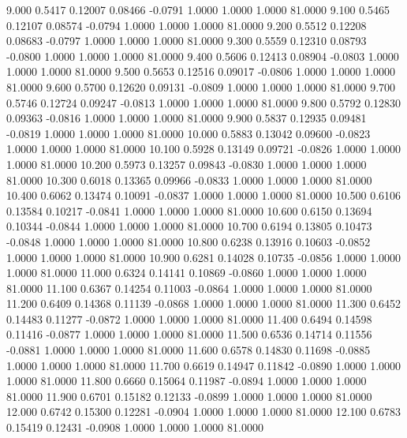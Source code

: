    9.000   0.5417   0.12007   0.08466  -0.0791   1.0000   1.0000   1.0000  81.0000
   9.100   0.5465   0.12107   0.08574  -0.0794   1.0000   1.0000   1.0000  81.0000
   9.200   0.5512   0.12208   0.08683  -0.0797   1.0000   1.0000   1.0000  81.0000
   9.300   0.5559   0.12310   0.08793  -0.0800   1.0000   1.0000   1.0000  81.0000
   9.400   0.5606   0.12413   0.08904  -0.0803   1.0000   1.0000   1.0000  81.0000
   9.500   0.5653   0.12516   0.09017  -0.0806   1.0000   1.0000   1.0000  81.0000
   9.600   0.5700   0.12620   0.09131  -0.0809   1.0000   1.0000   1.0000  81.0000
   9.700   0.5746   0.12724   0.09247  -0.0813   1.0000   1.0000   1.0000  81.0000
   9.800   0.5792   0.12830   0.09363  -0.0816   1.0000   1.0000   1.0000  81.0000
   9.900   0.5837   0.12935   0.09481  -0.0819   1.0000   1.0000   1.0000  81.0000
  10.000   0.5883   0.13042   0.09600  -0.0823   1.0000   1.0000   1.0000  81.0000
  10.100   0.5928   0.13149   0.09721  -0.0826   1.0000   1.0000   1.0000  81.0000
  10.200   0.5973   0.13257   0.09843  -0.0830   1.0000   1.0000   1.0000  81.0000
  10.300   0.6018   0.13365   0.09966  -0.0833   1.0000   1.0000   1.0000  81.0000
  10.400   0.6062   0.13474   0.10091  -0.0837   1.0000   1.0000   1.0000  81.0000
  10.500   0.6106   0.13584   0.10217  -0.0841   1.0000   1.0000   1.0000  81.0000
  10.600   0.6150   0.13694   0.10344  -0.0844   1.0000   1.0000   1.0000  81.0000
  10.700   0.6194   0.13805   0.10473  -0.0848   1.0000   1.0000   1.0000  81.0000
  10.800   0.6238   0.13916   0.10603  -0.0852   1.0000   1.0000   1.0000  81.0000
  10.900   0.6281   0.14028   0.10735  -0.0856   1.0000   1.0000   1.0000  81.0000
  11.000   0.6324   0.14141   0.10869  -0.0860   1.0000   1.0000   1.0000  81.0000
  11.100   0.6367   0.14254   0.11003  -0.0864   1.0000   1.0000   1.0000  81.0000
  11.200   0.6409   0.14368   0.11139  -0.0868   1.0000   1.0000   1.0000  81.0000
  11.300   0.6452   0.14483   0.11277  -0.0872   1.0000   1.0000   1.0000  81.0000
  11.400   0.6494   0.14598   0.11416  -0.0877   1.0000   1.0000   1.0000  81.0000
  11.500   0.6536   0.14714   0.11556  -0.0881   1.0000   1.0000   1.0000  81.0000
  11.600   0.6578   0.14830   0.11698  -0.0885   1.0000   1.0000   1.0000  81.0000
  11.700   0.6619   0.14947   0.11842  -0.0890   1.0000   1.0000   1.0000  81.0000
  11.800   0.6660   0.15064   0.11987  -0.0894   1.0000   1.0000   1.0000  81.0000
  11.900   0.6701   0.15182   0.12133  -0.0899   1.0000   1.0000   1.0000  81.0000
  12.000   0.6742   0.15300   0.12281  -0.0904   1.0000   1.0000   1.0000  81.0000
  12.100   0.6783   0.15419   0.12431  -0.0908   1.0000   1.0000   1.0000  81.0000
